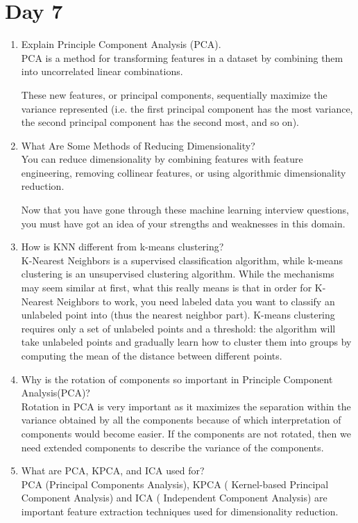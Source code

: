 \documentclass[11pt]{article}
\begin{document}
\section{Day 7}
\begin{enumerate}
\item Explain Principle Component Analysis (PCA).\\[.5em]
PCA is a method for transforming features in a dataset by combining them into uncorrelated
linear combinations.

These new features, or principal components, sequentially maximize the variance represented
(i.e. the first principal component has the most variance, the second principal component has
the second most, and so on).

\item What Are Some Methods of Reducing Dimensionality?\\[.5em]
You can reduce dimensionality by combining features with feature engineering, removing
collinear features, or using algorithmic dimensionality reduction.

Now that you have gone through these machine learning interview questions, you must have
got an idea of your strengths and weaknesses in this domain.

\item How is KNN different from k-means clustering?\\[.5em]
K-Nearest Neighbors is a supervised classification algorithm, while k-means clustering is an
unsupervised clustering algorithm. While the mechanisms may seem similar at first, what this
really means is that in order for K-Nearest Neighbors to work, you need labeled data you want
to classify an unlabeled point into (thus the nearest neighbor part). K-means clustering requires
only a set of unlabeled points and a threshold: the algorithm will take unlabeled points and
gradually learn how to cluster them into groups by computing the mean of the distance between
different points.

\item Why is the rotation of components so important in Principle Component
Analysis(PCA)?\\[.5em]
Rotation in PCA is very important as it maximizes the separation within the variance obtained by
all the components because of which interpretation of components would become easier. If the
components are not rotated, then we need extended components to describe the variance of
the components.

\item What are PCA, KPCA, and ICA used for?\\[.5em]
PCA (Principal Components Analysis), KPCA ( Kernel-based Principal Component Analysis)
and ICA ( Independent Component Analysis) are important feature extraction techniques used
for dimensionality reduction.
\end{enumerate}
\pagebreak
\end{document}
